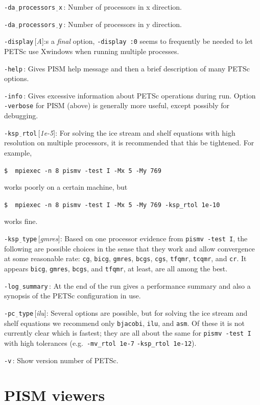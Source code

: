 \documentclass[11pt,final]{amsart}
\renewcommand{\t}[1]{\texttt{#1}}
\newcommand{\rawopt}[1]{\vspace{1mm}\noindent \Large\texttt{-#1}\normalsize}
\newcommand{\opt}[1]{\rawopt{#1}\,:\quad}
\newcommand{\optdef}[2]{\rawopt{#1}\,[\textsl{#2}]:\quad}
\newcommand{\und}{$\underline{\,\,\,}$}
\begin{document}
\opt{da\und processors\und x}  Number of processors in x direction.

\opt{da\und processors\und y}  Number of processors in y direction.

\optdef{display}  As a \emph{final} option, \verb|-display :0| seems to frequently be needed to let PETSc use Xwindows when running multiple processes.

\opt{help}  Gives PISM help message and then a brief description of many PETSc options.

\opt{info}  Gives excessive information about PETSc operations during run.  Option \verb|-verbose| for PISM (above) is generally more useful, except possibly for debugging.

\optdef{ksp\und rtol}{1e-5}  For solving the ice stream and shelf equations with high resolution on multiple processors, it is recommended that this be tightened.  For example, 

\verb|$  mpiexec -n 8 pismv -test I -Mx 5 -My 769|

\noindent works poorly on a certain machine, but

\verb|$  mpiexec -n 8 pismv -test I -Mx 5 -My 769 -ksp_rtol 1e-10|

\noindent works fine.

\optdef{ksp\und type}{gmres}  Based on one processor evidence from \verb|pismv -test I|, the following are possible choices in the sense that they work and allow convergence at some reasonable rate: \t{cg}, \t{bicg}, \t{gmres}, \t{bcgs}, \t{cgs}, \t{tfqmr}, \t{tcqmr}, and \t{cr}.  It appears \t{bicg}, \t{gmres}, \t{bcgs}, and \t{tfqmr}, at least, are all among the best.

\opt{log\und summary}  At the end of the run gives a performance summary and also a synopsis of the PETSc configuration in use.

\optdef{pc\und type}{ilu}   Several options are possible, but for solving the ice stream and shelf equations we recommend only \t{bjacobi}, \t{ilu}, and \t{asm}.  Of these it is not currently clear which is fastest; they are all about the same for \verb|pismv -test I| with high tolerances (e.g.~\verb|-mv_rtol 1e-7| \verb|-ksp_rtol 1e-12|).

\opt{v}   Show version number of PETSc.


\clearpage \newpage
\section{PISM viewers}\label{sect:viewers}
\end{document}
